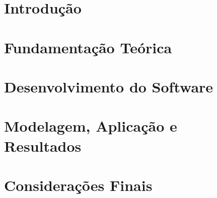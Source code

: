 \documentclass{./public/ufpatccdoisautores}
\begin{document}

\chapter{Introdução}


\chapter{Fundamentação Teórica}


\chapter{Desenvolvimento do Software}


\chapter{Modelagem, Aplicação e Resultados}


\chapter{Considerações Finais}


\renewcommand\bibname{Referências Bibliográficas}



\clearpage

\end{document}
